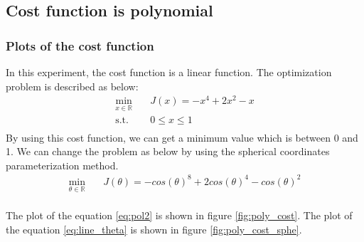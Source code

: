 \documentclass[a4paper,12pt]{article}
\begin{document}


\subsection{Cost function is polynomial }
\subsubsection{Plots of the cost function }
In this experiment, the cost function is a linear function. The optimization problem is described as below:\\
\begin{equation}\label{eq:pol2}
\begin{aligned}
\min_{x\in \mathbb{R}} \quad &J(x) =-x^4+2x^2-x\\
\textrm{s.t.} \quad & 0 \leq x \leq 1\\
\end{aligned}
\end{equation}
By using this cost function, we can get a minimum value which is between 0 and 1. We can change the problem as below by using the spherical coordinates parameterization method.\\




\begin{equation}\label{eq:poly_theta}
\begin{aligned}
\min_{\theta\in \mathbb{R}} \quad &J(\theta) = -cos(\theta)^8+2cos(\theta)^4-cos(\theta)^2\\
\end{aligned}
\end{equation}

The plot of the equation \ref{eq:pol2} is shown in figure \ref{fig:poly_cost}.  The plot of the equation \ref{eq:line_theta} is shown in figure \ref{fig:poly_cost_sphe}.\\  
\end{document}
